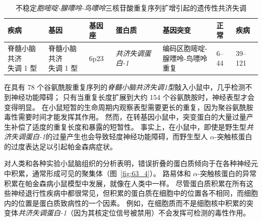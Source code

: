 \begin{table}[htbp]
	\caption{不稳定\textit{胞嘧啶-腺嘌呤-鸟嘌呤}三核苷酸重复序列扩增引起的遗传性共济失调} \label{tab:63_2} \centering
	\begin{tabular}{lllllll}
		\toprule
		疾病 & 基因 & 基因座 & 蛋白质 & 基因突变 & 正常 & 疾病 \\
		\midrule
		\makecell{脊髓小脑共济\\失调 1 型} & \makecell{脊髓小脑共济\\失调 1 型} & 6p23 & \textit{共济失调蛋白-1}   & \makecell{编码区胞嘧啶-\\腺嘌呤-鸟嘌呤重复} & 6–44 & 39–121 \\
		\bottomrule
	\end{tabular}
\end{table}


在具有 78 个谷氨酰胺重复序列的\textit{脊髓小脑共济失调1型}敲入小鼠中，几乎检测不到神经功能障碍；
只有当重复长度扩展到大约 154 个谷氨酰胺时，神经表型才会变得明显。
在小鼠短暂的生命周期内观察表型需要更长的重复，因为聚谷氨酰胺毒性需要时间才能发挥其作用。
然而，在转基因小鼠中，突变蛋白的大量过量产生补偿了适度的重复长度和暴露的短暂性。
事实上，在小鼠中，即使是野生型\textit{共济失调蛋白-1}的过量产生也会导致轻度神经功能障碍，而野生型人 $\alpha$-突触核蛋白的过度表达足以引起帕金森病症状。


对人类和各种实验小鼠脑组织的分析表明，错误折叠的蛋白质倾向于在各种神经元中积累，通常形成可见的聚集体（图~\ref{fig:63_4}）。
路易体和 $\alpha$-突触核蛋白的异常积累在帕金森病小鼠模型中发展，就像在人类中一样。
尽管蛋白质积累在所有这些神经退行性疾病中都很常见，但积累的蛋白质在细胞中的位置各不相同，而细胞内的位置是蛋白质致病性的一个因素。
例如，在细胞质而不是细胞核中积累的突变体\textit{共济失调蛋白-1}（因为其核定位信号被禁用）不会发挥可检测的毒性作用。


